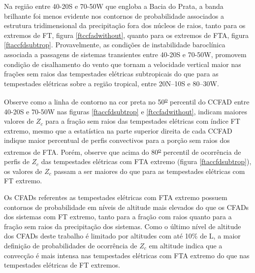 Na região entre 40-20S e 70-50W que engloba a Bacia do Prata, a banda brilhante foi menos evidente nos contornos de probabilidade associados a estrutura tridimensional da precipitação fora dos núcleos de raios, tanto para os extremos de FT, figura \ref{ftccfadwithout}, quanto para os extremos de FTA, figura \ref{ftaccfdsubtrop}. Provavelmente, as condições de instabilidade baroclínica associada a passagens de sistemas transientes  entre 40-20S e 70-50W, promovem condição de cisalhamento do vento que tornam a velocidade vertical maior nas frações sem raios das tempestades elétricas subtropicais do que para as tempestades elétricas sobre a região tropical, entre 20N--10S e 80--30W.


Observe como a linha de contorno na cor preta no 50\textsuperscript{\underline{o}} percentil do CCFAD entre 40-20S e 70-50W nas figuras \ref{ftaccfdsubtrop} e \ref{ftccfadwithout}, indicam maiores valores de $Z_c$ para a fração sem raios das tempestades elétricas com índice FT extremo, mesmo que a estatística na parte superior direita de cada CCFAD indique maior percentual de perfis convectivos para a porção sem raios dos extremos de FTA. Porém, observe que acima do 80\textsuperscript{\underline{o}} percentil de ocorrência de perfis de $Z_c$ das tempestades elétricas com FTA extremo (figura \ref{ftaccfdsubtrop}), os valores de $Z_c$ passam a ser maiores do que para as tempestades elétricas com FT extremo. 



Os CFADs referentes as tempestades elétricas com FTA extremo possuem contornos de probabilidade em níveis de altitude mais elevados do que os CFADs dos sistemas com FT extremo, tanto para a fração com raios quanto para a fração sem raios da precipitação dos sistemas. Como o último nível de altitude dos CFADs deste trabalho é limitado por altitudes com até 10\% de L, a maior definição de probabilidades de ocorrência de $Z_c$ em altitude indica que a convecção é mais intensa nas tempestades elétricas com FTA extremo do que nas tempestades elétricas de FT extremos.

